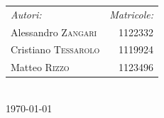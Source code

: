 {\begin{titlepage}
\begin{minipage}{0.4\textwidth}
\begin{flushleft} \large

\begin{tabular}{l r}
	\emph{Autori:} & \emph{Matricole:} \\
	Alessandro \textsc{Zangari} & 1122332 \\
	Cristiano \textsc{Tessarolo} & 1119924 \\
	Matteo \textsc{Rizzo} & 1123496 \\
\end{tabular}

\end{flushleft}

\end{minipage}\\[2cm]



{\large \today}\\[2cm] %

\vfill %

\end{titlepage}
}
\makeatother